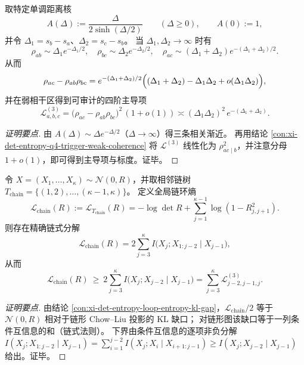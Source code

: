 \begin{conclusion}\label{con:xi-det-entropy-exp-tail-kernel-audit-asymptotics}
取特定单调距离核
\[
A(\Delta):=\frac{\Delta}{2\sinh(\Delta/2)}\qquad(\Delta\ge0),
\qquad
A(0):=1,
\]
并令 \(\Delta_1=s_b-s_a\)、\(\Delta_2=s_c-s_b\)。
当 \(\Delta_1,\Delta_2\to\infty\) 时有
\[
\rho_{ab}\sim \Delta_1e^{-\Delta_1/2},\quad
\rho_{bc}\sim \Delta_2e^{-\Delta_2/2},\quad
\rho_{ac}\sim (\Delta_1+\Delta_2)e^{-(\Delta_1+\Delta_2)/2}.
\]
从而
\[
\rho_{ac}-\rho_{ab}\rho_{bc}
=e^{-(\Delta_1+\Delta_2)/2}\Bigl((\Delta_1+\Delta_2)-\Delta_1\Delta_2+o(\Delta_1\Delta_2)\Bigr),
\]
并在弱相干区得到可审计的四阶主导项
\[
\mathcal L^{(3)}_{a,b,c}
=\bigl(\rho_{ac}-\rho_{ab}\rho_{bc}\bigr)^2\,(1+o(1))
\asymp (\Delta_1\Delta_2)^2\,e^{-(\Delta_1+\Delta_2)}.
\]
\end{conclusion}
\begin{proof}[证明要点]
由 \(A(\Delta)\sim \Delta e^{-\Delta/2}\)（\(\Delta\to\infty\)）得三条相关渐近。
再用结论 \ref{con:xi-det-entropy-q4-trigger-weak-coherence} 将 \(\mathcal L^{(3)}\) 线性化为 \(\rho_{ac\mid b}^2\)，并注意分母 \(1+o(1)\)，即可得到主导项与标度。证毕。
\end{proof}

\begin{conclusion}\label{con:xi-det-entropy-chain-loop-entropy-chain-rule}
令 \(X=(X_1,\dots,X_\kappa)\sim\mathcal N(0,R)\)，并取相邻链树
\(
T_{\mathrm{chain}}=\{(1,2),\dots,(\kappa-1,\kappa)\}
\)。
定义全局链环熵
\[
\mathcal L_{\mathrm{chain}}(R):=\mathcal L_{T_{\mathrm{chain}}}(R)
=-\log\det R+\sum_{j=1}^{\kappa-1}\log(1-R_{j,j+1}^2).
\]
则存在精确链式分解
\[
\mathcal L_{\mathrm{chain}}(R)
=2\sum_{j=3}^{\kappa} I\!\bigl(X_j;X_{1:j-2}\mid X_{j-1}\bigr),
\]
从而
\[
\mathcal L_{\mathrm{chain}}(R)\ \ge\ 2\sum_{j=3}^{\kappa} I\!\bigl(X_j;X_{j-2}\mid X_{j-1}\bigr)
=\sum_{j=3}^{\kappa}\mathcal L^{(3)}_{j-2,j-1,j}.
\]
\end{conclusion}
\begin{proof}[证明要点]
由结论 \ref{con:xi-det-entropy-loop-entropy-kl-gap}，\(\mathcal L_{\mathrm{chain}}/2\) 等于 \(\mathcal N(0,R)\) 相对于链形 Chow--Liu 投影的 KL 缺口；
对链形图该缺口等于一列条件互信息的和（链式法则）。
下界由条件互信息的逐项非负分解
\(
I(X_j;X_{1:j-2}\mid X_{j-1})=\sum_{i=1}^{j-2}I(X_j;X_i\mid X_{i+1:j-1})\ge I(X_j;X_{j-2}\mid X_{j-1})
\)
给出。证毕。
\end{proof}

